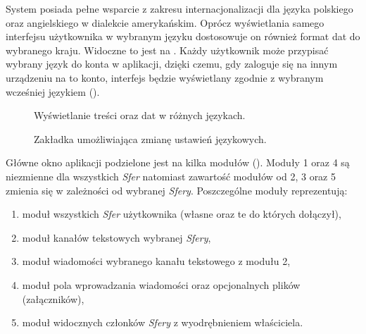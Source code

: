 
System posiada pełne wsparcie z zakresu internacjonalizacji dla języka polskiego oraz angielskiego w dialekcie
amerykańskim. Oprócz wyświetlania samego interfejsu użytkownika w wybranym języku dostosowuje on również format dat do
wybranego kraju. Widoczne to jest na . Każdy użytkownik może przypisać wybrany język do
konta w aplikacji, dzięki czemu, gdy zaloguje się na innym urządzeniu na to konto, interfejs będzie wyświetlany zgodnie
z wybranym wcześniej językiem ().
%
\begin{figure}[H]
  \centering
  \begin{subfigure}[b]{0.40\textwidth}
    \centering
  \end{subfigure}
  \hfill
  \begin{subfigure}[b]{0.40\textwidth}
    \centering
  \end{subfigure}
  \caption{Wyświetlanie treści oraz dat w różnych językach.}
  \label{fig:lang-comparison}
\end{figure}
%
\begin{figure}[H]
  \centering
  \caption{Zakładka umożliwiająca zmianę ustawień językowych.}
  \label{fig:change-language}
\end{figure}


Główne okno aplikacji podzielone jest na kilka modułów (). Moduły 1 oraz 4 są niezmienne dla
wszystkich \textit{Sfer} natomiast zawartość modułów od 2, 3 oraz 5 zmienia się w zależności od wybranej \textit{Sfery}.
Poszczególne moduły reprezentują:
%
\begin{enumerate}
  \item moduł wszystkich \textit{Sfer} użytkownika (własne oraz te do których dołączył),
  \item moduł kanałów tekstowych wybranej \textit{Sfery},
  \item moduł wiadomości wybranego kanału tekstowego z modułu 2,
  \item moduł pola wprowadzania wiadomości oraz opcjonalnych plików (załączników),
  \item moduł widocznych członków \textit{Sfery} z wyodrębnieniem właściciela.
\end{enumerate}

